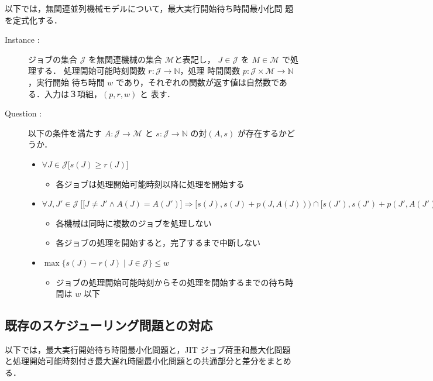 \documentclass[12pt]{optlab-bachelor}
\begin{document}
以下では，無関連並列機械モデルについて，最大実行開始待ち時間最小化問
題を定式化する．

\begin{description}

  \item[Instance : ] ジョブの集合 $\mathcal{J}$ を無関連機械の集合 $\mathcal{M}$と表記し，
  $J \in \mathcal{J}$ を $M \in \mathcal{M}$ で処理する．
  処理開始可能時刻関数 $r : \mathcal{J} \to \mathbb{N}$，処理
  時間関数 $p : \mathcal{J} \times \mathcal{M} \to \mathbb{N}$，実行開始
  待ち時間 $w$ であり，それぞれの関数が返す値は自然数である．入力は３項組，$(p,r,w)$ と
  表す．

  \item[Question : ] 以下の条件を満たす $A : \mathcal{J} \to \mathcal{M}$ と $s : \mathcal{J} \to \mathbb{N}$ の対$(A,s)$ が存在するかどうか．
  \begin{itemize}
    \item $\forall J \in \mathcal{J}\big[s(J) \ge r(J) \big]$
    \begin{itemize}
      \item 各ジョブは処理開始可能時刻以降に処理を開始する
    \end{itemize}
    \item {\scriptsize $\forall J, J' \in \mathcal{J}\ \Big[ \big[J\ne J' \land A(J) = A(J')\big] \Rightarrow [s(J), s(J)+p(J,A(J))) \cap[s(J'), s(J')+p(J', A(J'))) = \emptyset \Big]$}
    \begin{itemize}
      \item 各機械は同時に複数のジョブを処理しない
      \item 各ジョブの処理を開始すると，完了するまで中断しない
    \end{itemize}
    \item $\max\big\{s(J) - r(J) \mid J \in \mathcal{J}\big\} \le w$
    \begin{itemize}
      \item ジョブの処理開始可能時刻からその処理を開始するまでの待ち時間は $w$ 以下
    \end{itemize}
  \end{itemize}
\end{description}

\subsection{既存のスケジューリング問題との対応}
以下では，最大実行開始待ち時間最小化問題と，JIT ジョブ荷重和最大化問題
と処理開始可能時刻付き最大遅れ時間最小化問題との共通部分と差分をまとめ
る．
\end{document}
